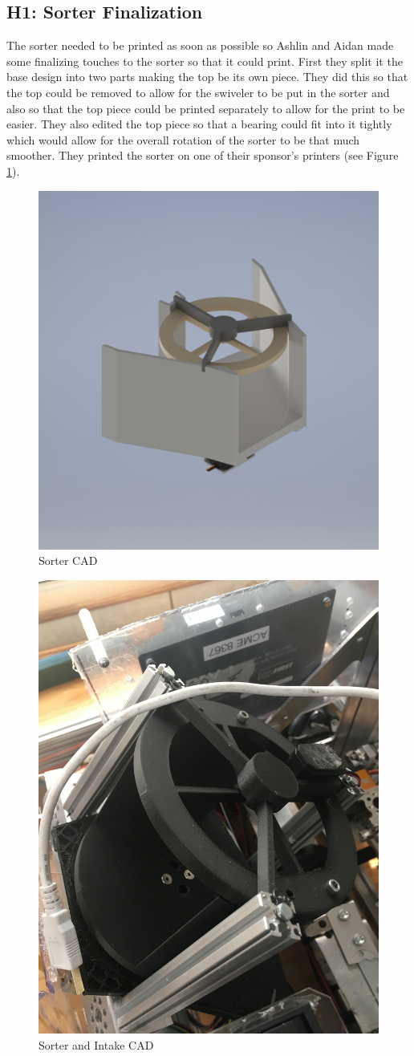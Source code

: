 \documentclass{article}
\begin{document}
\subsection{H1: Sorter Finalization}

The sorter needed to be printed as soon as possible so Ashlin and Aidan made some finalizing touches to the sorter so that it could print. First they split it the base design into two parts making the top be its own piece. They did this so that the top could be removed to allow for the swiveler to be put in the sorter and also so that the top piece could be printed separately to allow for the print to be easier. They also edited the top piece so that a bearing could fit into it tightly which would allow for the overall rotation of the sorter to be that much smoother. They printed the sorter on one of their sponsor's printers (see Figure \ref{fig:Sorter CAD}).

\begin{figure}
    \centering
    \includegraphics[width=.6 \textwidth, ]{10_11-05/images/og_sorter[1].png}
    \caption{Sorter CAD}
    \label{fig:Sorter CAD}
\end{figure}

\begin{figure}
    \centering
    \includegraphics[width=.6 \textwidth, angle=270 ]{10_11-05/images/sorter.JPG}
    \caption{Sorter and Intake CAD}
    \label{fig:Intake CAD}
\end{figure}
\end{document}
